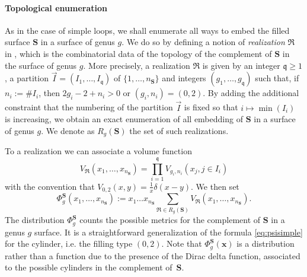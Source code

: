 \documentclass[12pt,twoside]{article}
\theoremstyle{theorem}
\theoremstyle{remark}
\theoremstyle{definition}
\theoremstyle{example}
\newcommand{\x}{\mathbf{x}}
\newcommand{\1}[1]{\mathds{1}_{#1}}
\newcommand{\Sf}{\mathbf{S}}
\newcommand{\n}{n_{\mathbf{S}}}
\begin{document}
\paragraph{Topological enumeration}

As in the case of simple loops, we shall enumerate all ways to embed the filled surface $\Sf$ in a
surface of genus $g$. We do so by defining a notion of \emph{realization} $\mathfrak{R}$ in \cite[\S
4]{anantharaman2023}, which is the combinatorial data of the topology of the complement of $\Sf$ in
the surface of genus $g$. More precisely, a realization $\mathfrak{R}$ is given by an integer
$\mathfrak{q} \geq 1$, a partition $\vec{I}=(I_1, \ldots, I_{\mathfrak{q}})$ of $\{1, \ldots, \n\}$
and integers $(g_1, \ldots,g_{\mathfrak{q}})$ such that, if $n_i := \#I_i$, then $2g_i-2+n_i>0$ or
$(g_i,n_i)=(0,2)$.  By adding the additional constraint that the numbering of the partition
$\vec{I}$ is fixed so that $i \mapsto \min(I_i)$ is increasing, we obtain an exact enumeration of
all embedding of $\Sf$ in a surface of genus $g$. We denote as $R_g(\Sf)$ the set of such
realizations.

To a realization we can associate a volume function
\begin{equation}
  \label{eq:volR}
  V_{\mathfrak{R}}(x_1, \ldots, x_{\n})
  = \prod_{i=1}^{\mathfrak{q}} V_{g_i,n_i}(x_j, j \in I_i)
\end{equation}
with the convention that $V_{0,2}(x,y)=\frac{1}{x}\delta(x-y)$.
We then set 
\begin{equation}
  \label{eq:def_phi_S}
  \Phi_g^\Sf(x_1, \ldots, x_{\n}) := x_1 \ldots x_{\n}
  \sum_{\mathfrak{R} \in R_g(\Sf)}
  V_{\mathfrak{R}}(x_1, \ldots, x_{\n}).
\end{equation}
The distribution $\Phi_g^{\Sf}$ counts the possible metrics for the complement of $\Sf$ in a genus
$g$ surface. It is a straightforward generalization of the formula \eqref{eq:psisimple} for the
cylinder, i.e. the filling type $(0,2)$.  Note that $\Phi_g^\Sf(\x)$ is a distribution rather than a
function due to the presence of the Dirac delta function, associated to the possible cylinders in
the complement of~$\Sf$.
\end{document}
